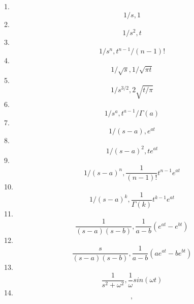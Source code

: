  1. \[ 1/s , 1 \]
 2. \[ 1/s^2 , t \]
 3. \[ 1/s^n , t^{n-1}/(n-1)! \]
 4. \[ 1/\sqrt{s} , 1/\sqrt{\pi t} \]
 5. \[ 1/s^{3/2} , 2\sqrt{t/\pi} \]
 6. \[ 1/s^a  , t^{a-1}/\Gamma(a) \]
 7. \[ 1/(s-a) , e^{at} \]
 8. \[ 1/(s-a)^2 , te^{at} \]
 9. \[ 1/(s-a)^n , \frac{1}{(n-1)!}t^{n-1}e^{at} \]
10. \[ 1/(s-a)^k , \frac{1}{\Gamma(k)}t^{k-1}e^{at} \]
11. \[ \frac{1}{(s-a)(s-b)} , \frac{1}{a-b}(e^{at}-e^{bt}) \]
12. \[ \frac{s}{(s-a)(s-b)} , \frac{1}{a-b}(ae^{at}-be^{bt}) \]
13. \[ \frac{1}{s^2+\omega^2} , \frac{1}{\omega}sin(\omega t) \]
14. \[ , \]
